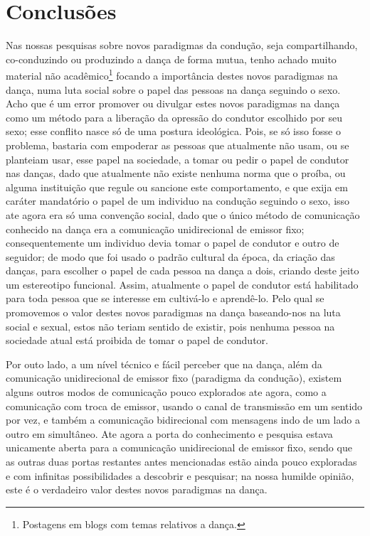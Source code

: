 \documentclass[a4paper,10pt]{article}
\begin{document}
\section{Conclusões}
Nas nossas pesquisas sobre novos paradigmas da condução, seja compartilhando, 
co-conduzindo ou produzindo a dança de forma mutua, 
tenho achado muito material não 
acadêmico\footnote{Postagens em blogs com temas relativos a dança.} 
focando a importância destes novos paradigmas na dança, 
numa luta social sobre o papel das pessoas na dança seguindo o sexo.
Acho que é um error promover ou divulgar estes novos paradigmas na dança 
como um método para a liberação da opressão do condutor escolhido por seu sexo;
esse conflito nasce só de uma postura ideológica. 
Pois, se só isso fosse o problema, 
bastaria com empoderar as pessoas que atualmente não usam, 
ou se planteiam usar, esse papel na sociedade, 
a tomar ou pedir o papel de condutor nas danças, 
dado que atualmente não existe nenhuma norma que o proíba,
ou alguma instituição que regule ou sancione este comportamento,
e que exija em caráter mandatório o papel de um individuo na condução seguindo o sexo,
isso ate agora era só uma convenção social, 
dado que o único método de comunicação conhecido na dança era a comunicação unidirecional de emissor fixo;
consequentemente um individuo devia tomar o papel de condutor e outro de seguidor;
de modo que foi usado o padrão cultural da época, da criação das danças, 
para escolher o papel de cada pessoa na dança a dois,
criando deste jeito um estereotipo funcional. 
Assim, atualmente o papel de condutor está habilitado para toda pessoa que se interesse em 
cultivá-lo e aprendê-lo. 
Pelo qual se promovemos o valor destes novos paradigmas na dança baseando-nos na luta social e sexual, 
estos não teriam sentido de existir, 
pois nenhuma pessoa na sociedade atual está proibida de tomar o papel de condutor.

Por outo lado, a um nível técnico e fácil perceber que na dança, além da comunicação 
unidirecional de emissor fixo  (paradigma da condução),
existem alguns outros modos de comunicação pouco explorados ate agora,
como a comunicação com troca de emissor, 
usando o canal de transmissão em um sentido por vez,
e também a comunicação bidirecional com mensagens indo de um lado a outro em simultâneo.
Ate agora a porta do conhecimento e pesquisa estava unicamente aberta para a 
comunicação unidirecional de emissor fixo, 
sendo que as outras duas portas restantes antes mencionadas estão ainda pouco 
exploradas e com infinitas possibilidades a descobrir e pesquisar; 
na nossa humilde opinião, este é o verdadeiro valor destes novos paradigmas na dança. 


\medskip
 
\printbibliography
\end{document}
